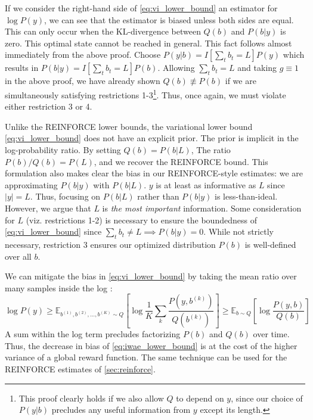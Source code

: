 \documentclass{article}
\begin{document}
If we consider the right-hand side of \cref{eq:vi_lower_bound} an estimator for
$\log P(y)$, we can see that the estimator is biased unless both sides are
equal. This can only occur when the KL-divergence between $Q(b)$ and $P(b|y)$
is zero. This optimal state cannot be reached in general. This fact follows
almost immediately from the above proof. Choose $P(y|b) = I[\sum_t b_t = L]
P(y)$ which results in $P(b|y) = I[\sum_t b_t = L] P(b)$. Allowing $\sum_t b_t
= L$ and taking $g \equiv 1$ in the above proof, we have already shown $Q(b)
\not \equiv P(b)$ if we are simultaneously satisfying restrictions
1-3\footnote{
%
    This proof clearly holds if we also allow $Q$ to depend on $y$, since our
    choice of $P(y|b)$ precludes any useful information from $y$ except its
    length.
%
}. Thus, once again, we must violate either restriction 3 or 4.

Unlike the REINFORCE lower bounds, the variational lower bound
\cref{eq:vi_lower_bound} does not have an explicit prior. The prior is implicit
in the log-probability ratio. By setting $Q(b) = P(b|L)$, The ratio $P(b) /
Q(b) = P(L)$, and we recover the REINFORCE bound. This formulation also makes
clear the bias in our REINFORCE-style estimates: we are approximating $P(b|y)$
with $P(b|L)$. $y$ is at least as informative as $L$ since $|y| = L$. Thus,
focusing on $P(b|L)$ rather than $P(b|y)$ is less-than-ideal. However, we argue
that $L$ is \emph{the most important} information. Some consideration for $L$
(viz. restrictions 1-2) is necessary to ensure the boundedness of
\cref{eq:vi_lower_bound} since $\sum_t b_t \neq L \implies P(b|y) = 0$. While
not strictly necessary, restriction 3 ensures our optimized distribution $P(b)$
is well-defined over all $b$.

We can mitigate the bias in \cref{eq:vi_lower_bound} by taking the mean ratio
over many samples inside the log
\cite{burdaImportanceWeightedAutoencoders2016}:
%
\begin{equation} \label{eq:iwae_lower_bound}
    \log P(y) \geq \mathbb{E}_{b^{(1)}, b^{(2)}, \ldots, b^{(K)} \sim Q} \left[
        \log \frac{1}{K} \sum_k \frac{P(y, b^{(k)})}{Q(b^{(k)})} \right]
    \geq \mathbb{E}_{b \sim Q} \left[\log \frac{P(y, b)}{Q(b)}\right]
\end{equation}
%
A sum within the log term precludes factorizing $P(b)$ and $Q(b)$ over time.
Thus, the decrease in bias of \cref{eq:iwae_lower_bound} is at the cost of
the higher variance of a global reward function. The same technique can be used
for the REINFORCE estimates of \cref{sec:reinforce}.
\end{document}
